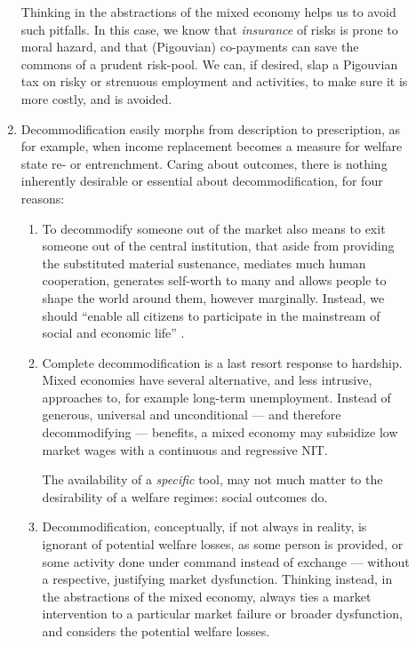 \begin{description}
\begin{enumerate}
		Thinking in the abstractions of the mixed economy helps us to avoid such pitfalls.
In this case, we know that \emph{insurance} of risks is prone to moral hazard, and that (Pigouvian) co-payments can save the commons of a prudent risk-pool.
We can, if desired, slap a Pigouvian tax on risky or strenuous employment and activities, to make sure it is more costly, and is avoided.

		\item Decommodification easily morphs from description to prescription, as for example, when income replacement becomes a measure for welfare state re- or entrenchment.
		Caring about outcomes, there is nothing inherently desirable or essential about decommodification, for four reasons:
			\begin{enumerate}
				\item To decommodify someone out of the market also means to exit someone out of the central institution, that aside from providing the substituted material sustenance, mediates much human cooperation, generates self-worth to many and allows people to shape the world around them, however marginally.
Instead, we should ``enable all citizens to participate in the mainstream of social and economic life'' \citep[ix]{Esping-Andersen2002}.

				\item Complete decommodification is a last resort response to hardship.
Mixed economies have several alternative, and less intrusive, approaches to, for example long-term unemployment.
Instead of generous, universal and unconditional --- and therefore decommodifying --- benefits, a mixed economy may subsidize low market wages with a continuous and regressive \gls{NIT}.

				The availability of a \emph{specific} tool, may not much matter to the desirability of a welfare regimes:
social outcomes do.

				\item Decommodification, conceptually, if not always in reality, is ignorant of potential welfare losses, as some person is provided, or some activity done under command instead of exchange --- without a respective, justifying market dysfunction.
Thinking instead, in the abstractions of the mixed economy, always ties a market intervention to a particular market failure or broader dysfunction, and considers the potential welfare losses.
			\end{enumerate}


\end{enumerate}
\end{description}

